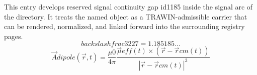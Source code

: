 
\begin{tzpsnapshot}
\end{tzpsnapshot}

This entry develops reserved signal continuity gap id1185 inside the signal arc of the directory. It treats the named object as a TRAWIN-admissible carrier that can be rendered, normalized, and linked forward into the surrounding registry pages.
\[
backslash frac{32}{27}=1.185185...
\]
\[
\vec{A} {dipole}(\vec{r},t) = \frac{\mu {0}}{4\pi}\frac{\vec{\mu} {eff}(t)\times(\vec{r}-\vec{r} {cm}(t))}{|\vec{r}-\vec{r} {cm}(t)|^{3}}
\]

